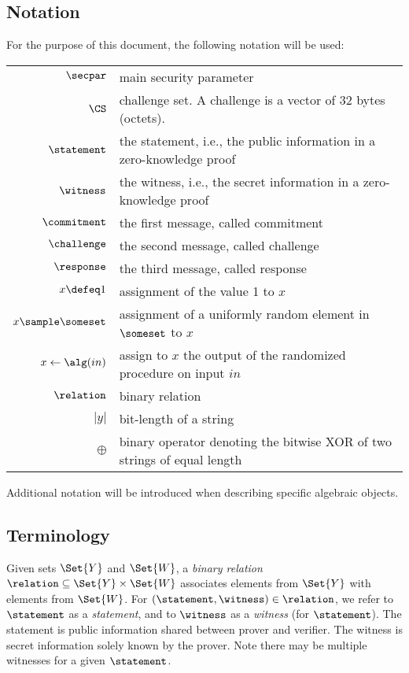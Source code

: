 \documentclass[11pt]{article}
\begin{document}
\subsection{Notation}
\label{sec:notation}

For the purpose of this document, the following notation will be used:

\begin{tabular}{r@{\hspace{1em}}p{11cm}}
    $\secpar$ & main security parameter\\
    $\CS$ & challenge set. A challenge is a vector of 32 bytes (octets).\\
    $\statement$ & the statement, i.e., the public information in a zero-knowledge proof \\
    $\witness$ & the witness, i.e., the secret information in a zero-knowledge proof \\
    $\commitment$ & the first message, called commitment \\
    $\challenge$ & the second message, called challenge \\
    $\response$ & the third message, called response \\
    $x \defeq 1$ & assignment of the value 1 to $x$\\
    $x\sample\someset$ & assignment of a uniformly random element in $\someset$ to $x$\\
    $x\gets\alg(in)$ & assign to $x$ the output of the randomized procedure on input $in$\\
    $\relation$ & binary relation\\
    $|y|$ & bit-length of a string \\
    $\oplus$ & binary operator denoting the bitwise XOR of two strings of equal length
\end{tabular}

Additional notation will be introduced when describing specific algebraic objects.
\subsection{Terminology}
Given sets $\Set{Y}$ and $\Set{W}$,
a \emph{binary relation} $\relation \subseteq \Set{Y} \times \Set{W}$ associates elements from $\Set{Y}$ with elements from $\Set{W}$.
For $(\statement,\witness)\in\relation$, we refer to $\statement$ as a \emph{statement}, and to $\witness$ as a \emph{witness} (for $\statement$).
The statement is public information shared between prover and verifier.
The witness is secret information solely known by the prover.
Note there may be multiple witnesses for a given $\statement$.
\end{document}
